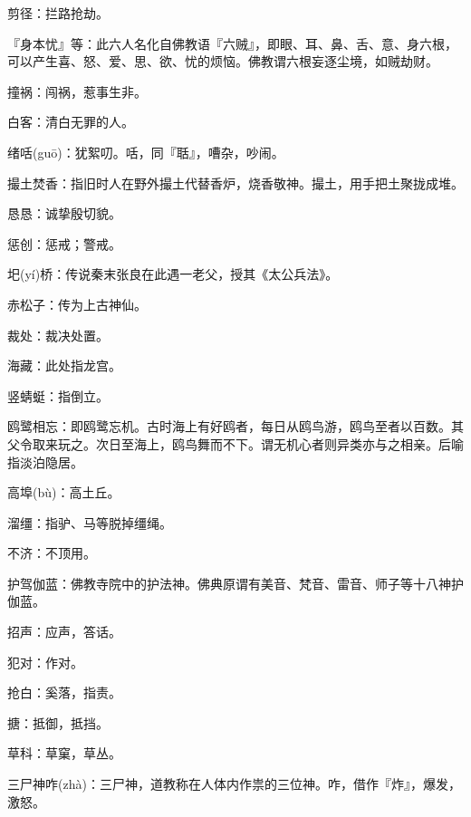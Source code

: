 \startbuffer[592]
剪径：拦路抢劫。
\stopbuffer


\startbuffer[593]
『身本忧』等：此六人名化自佛教语『六贼』，即眼、耳、鼻、舌、意、身六根，可以产生喜、怒、爱、思、欲、忧的烦恼。佛教谓六根妄逐尘境，如贼劫财。
\stopbuffer


\startbuffer[594]
撞祸：闯祸，惹事生非。
\stopbuffer


\startbuffer[595]
白客：清白无罪的人。
\stopbuffer


\startbuffer[596]
绪咶(guō)：犹絮叨。咶，同『聒』，嘈杂，吵闹。
\stopbuffer


\startbuffer[597]
撮土焚香：指旧时人在野外撮土代替香炉，烧香敬神。撮土，用手把土聚拢成堆。
\stopbuffer


\startbuffer[598]
恳恳：诚挚殷切貌。
\stopbuffer


\startbuffer[599]
惩创：惩戒；警戒。
\stopbuffer


\startbuffer[600]
圯(yí)桥：传说秦末张良在此遇一老父，授其《太公兵法》。
\stopbuffer


\startbuffer[601]
赤松子：传为上古神仙。
\stopbuffer


\startbuffer[602]
裁处：裁决处置。
\stopbuffer


\startbuffer[603]
海藏：此处指龙宫。
\stopbuffer


\startbuffer[604]
竖蜻蜓：指倒立。
\stopbuffer


\startbuffer[605]
鸥鹭相忘：即鸥鹭忘机。古时海上有好鸥者，每日从鸥鸟游，鸥鸟至者以百数。其父令取来玩之。次日至海上，鸥鸟舞而不下。谓无机心者则异类亦与之相亲。后喻指淡泊隐居。
\stopbuffer


\startbuffer[606]
高埠(bù)：高土丘。
\stopbuffer


\startbuffer[607]
溜缰：指驴、马等脱掉缰绳。
\stopbuffer


\startbuffer[608]
不济：不顶用。
\stopbuffer


\startbuffer[609]
护驾伽蓝：佛教寺院中的护法神。佛典原谓有美音、梵音、雷音、师子等十八神护伽蓝。
\stopbuffer


\startbuffer[610]
招声：应声，答话。
\stopbuffer


\startbuffer[611]
犯对：作对。
\stopbuffer


\startbuffer[612]
抢白：奚落，指责。
\stopbuffer


\startbuffer[613]
搪：抵御，抵挡。
\stopbuffer


\startbuffer[614]
草科：草窠，草丛。
\stopbuffer


\startbuffer[615]
三尸神咋(zhà)：三尸神，道教称在人体内作祟的三位神。咋，借作『炸』，爆发，激怒。
\stopbuffer


